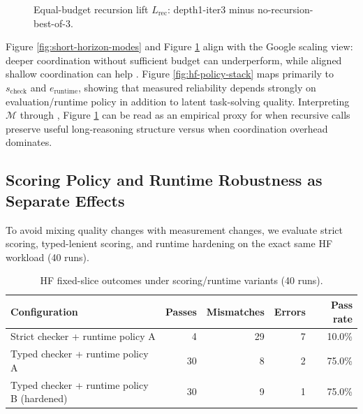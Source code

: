 \documentclass[11pt]{article}
\begin{document}
\begin{figure}[t]
\centering
{}
\caption{Equal-budget recursion lift \(L_{\text{rec}}\): depth1-iter3 minus no-recursion-best-of-3.}
\label{fig:recursion-lift}
\end{figure}

Figure \ref{fig:short-horizon-modes} and Figure \ref{fig:recursion-lift} align with the Google scaling view: deeper coordination without sufficient budget can underperform, while aligned shallow coordination can help \cite{kim2025scaling,google2026agentscaling}. Figure \ref{fig:hf-policy-stack} maps primarily to \(s_{\text{check}}\) and \(e_{\text{runtime}}\), showing that measured reliability depends strongly on evaluation/runtime policy in addition to latent task-solving quality.
Interpreting \(\mathcal{M}\) through \cite{chen2026molecular}, Figure \ref{fig:recursion-lift} can be read as an empirical proxy for when recursive calls preserve useful long-reasoning structure versus when coordination overhead dominates.

\subsection{Scoring Policy and Runtime Robustness as Separate Effects}
To avoid mixing quality changes with measurement changes, we evaluate strict scoring, typed-lenient scoring, and runtime hardening on the exact same HF workload (40 runs).

\begin{table}[t]
\centering
\caption{HF fixed-slice outcomes under scoring/runtime variants (40 runs).}
\label{tab:hf-robustness}
\begin{tabular}{lrrrr}
\toprule
Configuration & Passes & Mismatches & Errors & Pass rate \\
\midrule
Strict checker + runtime policy A & 4 & 29 & 7 & 10.0\% \\
Typed checker + runtime policy A & 30 & 8 & 2 & 75.0\% \\
Typed checker + runtime policy B (hardened) & 30 & 9 & 1 & 75.0\% \\
\bottomrule
\end{tabular}
\end{table}
\end{document}
